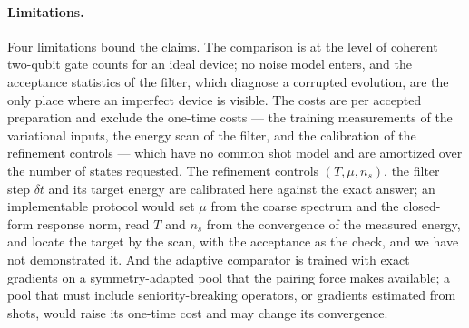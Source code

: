 \documentclass[
  aps,            %
  prc,            %
  reprint,        %
  superscriptaddress,
  floatfix,
  nofootinbib
]{revtex4-2}
\begin{document}
\paragraph{Limitations.}
Four limitations bound the claims.  The comparison is at the level of
coherent two-qubit gate counts for an ideal device; no noise model enters,
and the acceptance statistics of the filter, which diagnose a corrupted
evolution, are the only place where an imperfect device is visible.  The
costs are per accepted preparation and exclude the one-time costs --- the
training measurements of the variational inputs, the energy scan of the
filter, and the calibration of the refinement controls --- which have no
common shot model and are amortized over the number of states requested.
The refinement controls $(T,\mu,n_s)$, the filter step $\delta t$ and its
target energy are calibrated here against the exact answer; an
implementable protocol would set $\mu$ from the coarse spectrum and the
closed-form response norm, read $T$ and $n_s$ from the convergence of the
measured energy, and locate the target by the scan, with the acceptance as
the check, and we have not demonstrated it.  And the adaptive comparator is trained with exact gradients on a
symmetry-adapted pool that the pairing force makes available; a pool that
must include seniority-breaking operators, or gradients estimated from
shots, would raise its one-time cost and may change its convergence.
\end{document}
